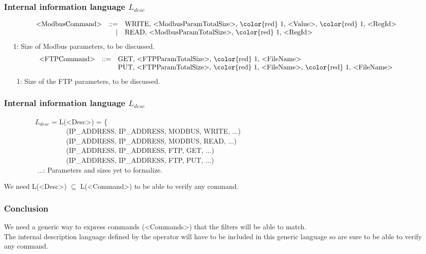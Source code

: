 \documentclass{beamer}
\begin{document}
\begin{frame}
    \frametitle{Internal information language $L_{desc}$}

    {\scriptsize
    \[
        \begin{array}{l r l}
            \text{<ModbusCommand>} & ::= & \text{WRITE, <ModbusParamTotalSize>, {\color{red} 1}, <Value>, {\color{red} 1}, <RegId>} \\
                                   &   | & \text{READ, <ModbusParamTotalSize>, {\color{red} 1}, <RegId>} \\
        \end{array}
    \]
    ~~{\color{red} 1}: Size of Modbus parameters, to be discussed.
    }
    \pause
    \vfill
    {\scriptsize
    \[
        \begin{array}{l r l}
            \text{<FTPCommand>} & ::= & \text{GET, <FTPParamTotalSize>, {\color{red} 1}, <FileName>} \\
                                &     & \text{PUT, <FTPParamTotalSize>, {\color{red} 1}, <FileName>, {\color{red} 1}, <FileName>} \\
        \end{array}
    \]
    ~~~{\color{red} 1}: Size of the FTP parameters, to be discussed.
    }
\end{frame}


\begin{frame}
    \frametitle{Internal information language $L_{desc}$}

    ~~~~~~~~~$L_{desc}$ = L(<Desc>) = \{ \\
    ~~~~~~~~~~~~~~~~~~(IP\_ADDRESS, IP\_ADDRESS, MODBUS, WRITE, {\color{red} ...}) \\
    ~~~~~~~~~~~~~~~~~~(IP\_ADDRESS, IP\_ADDRESS, MODBUS, READ, {\color{red} ...}) \\
    ~~~~~~~~~~~~~~~~~~(IP\_ADDRESS, IP\_ADDRESS, FTP, GET, {\color{red} ...}) \\
    ~~~~~~~~~~~~~~~~~~(IP\_ADDRESS, IP\_ADDRESS, FTP, PUT, {\color{red} ...}) \\
    \vfill
    ~~~~~~~~~{\color{red} ...}: Parameters and sizes yet to formalize.
    \vfill
    \begin{center}
        We need L(<Desc>) $\subseteq$ L(<Command>) to be able to verify any command.
    \end{center}
\end{frame}

\begin{frame}
    \frametitle{Conclusion}

    We need a generic way to express commands (<Commands>) that the filters will be able to match.\\
    \vfill
    The internal description language defined by the operator will have to be included in this generic language so are sure to be able to verify any command.
\end{frame}
\end{document}
